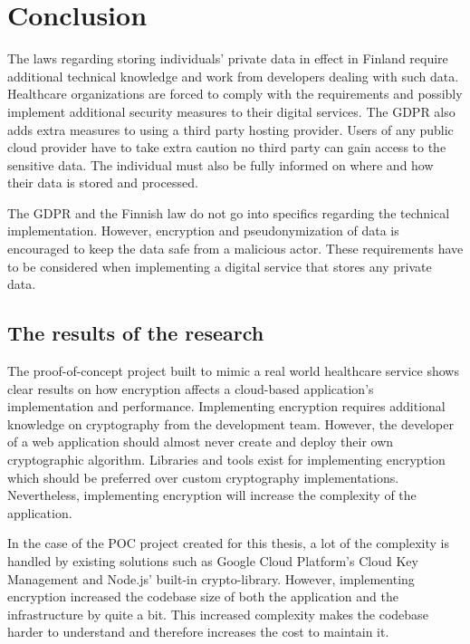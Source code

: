 \chapter{Conclusion} \label{conclusion}

The laws regarding storing individuals' private data in effect in Finland require additional technical knowledge and work from developers dealing with such data.
Healthcare organizations are forced to comply with the requirements and possibly implement additional security measures to their digital services.
The GDPR also adds extra measures to using a third party hosting provider.
Users of any public cloud provider have to take extra caution no third party can gain access to the sensitive data.
The individual must also be fully informed on where and how their data is stored and processed.

The GDPR and the Finnish law do not go into specifics regarding the technical implementation.
However, encryption and pseudonymization of data is encouraged to keep the data safe from a malicious actor.
These requirements have to be considered when implementing a digital service that stores any private data.

\section{The results of the research}

The proof-of-concept project built to mimic a real world healthcare service shows clear results on how encryption affects a cloud-based application's implementation and performance. Implementing encryption requires additional knowledge on cryptography from the development team.
However, the developer of a web application should almost never create and deploy their own cryptographic algorithm.\cite{dont-roll-crypto}
Libraries and tools exist for implementing encryption which should be preferred over custom cryptography implementations.
Nevertheless, implementing encryption will increase the complexity of the application.

In the case of the POC project created for this thesis, a lot of the complexity is handled by existing solutions such as Google Cloud Platform’s Cloud Key Management and Node.js’ built-in crypto-library.
However, implementing encryption increased the codebase size of both the application and the infrastructure by quite a bit.
This increased complexity makes the codebase harder to understand and therefore increases the cost to maintain it.

